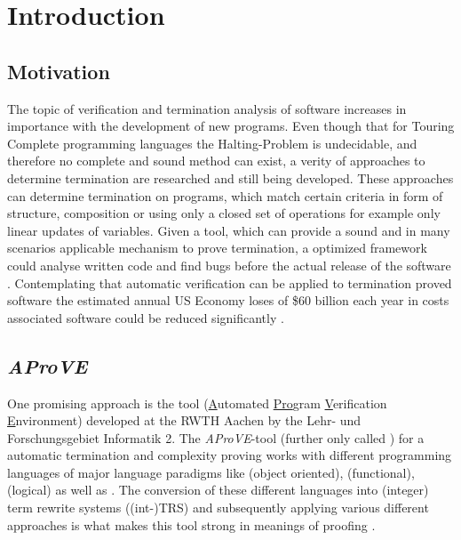 \chapter{Introduction}

\section{Motivation}
The topic of verification and termination analysis of software increases in importance with the development of new programs. Even though that for Touring Complete programming languages the Halting-Problem is undecidable, and therefore no complete and sound method can exist, a verity of approaches to determine termination are researched and still being developed. These approaches can determine termination on programs, which match certain criteria in form of structure, composition or using only a closed set of operations for example only linear updates of variables. \newline
Given a tool, which can provide a sound and in many scenarios applicable mechanism to prove termination, a optimized framework could analyse written code and find bugs before the actual release of the software \cite{verschaetse1993automatic}. Contemplating that automatic verification can be applied to termination proved software the estimated annual US Economy loses of \$60 billion each year in costs associated software could be reduced significantly \cite{zhivich2009real}. \newline

\section{\emph{AProVE}}
\label{sec:aprove}
One promising approach is the tool \aprove (\underline{A}utomated \underline{Pro}gram \underline{V}erification \underline{E}nvironment) developed at the RWTH Aachen by the Lehr- und Forschungsgebiet Informatik 2. The \emph{AProVE}-tool (further only called \aprove) for a automatic termination and complexity proving works with different programming languages of major language paradigms like  (object oriented),  (functional),  (logical) as well as . The conversion of these different languages into (integer) term rewrite systems ((int-)TRS) and subsequently applying various different approaches is what makes this tool strong in meanings of proofing \cite{giesl2017analyzing}.
